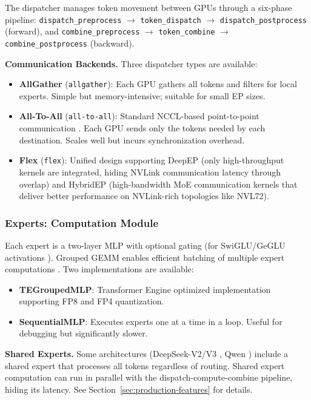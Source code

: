 \documentclass[10pt,logo,copyright]{nvidiatechreport}
\begin{document}
The dispatcher manages token movement between GPUs through a six-phase pipeline: \texttt{dispatch\_preprocess} $\rightarrow$ \texttt{token\_dispatch} $\rightarrow$ \texttt{dispatch\_postprocess} (forward), and \texttt{combine\_preprocess} $\rightarrow$ \texttt{token\_combine} $\rightarrow$ \texttt{combine\_postprocess} (backward).

\textbf{Communication Backends.} Three dispatcher types are available:
\begin{itemize}
    \item \textbf{AllGather} (\texttt{allgather}): Each GPU gathers all tokens and filters for local experts. Simple but memory-intensive; suitable for small EP sizes.
    \item \textbf{All-To-All} (\texttt{all-to-all}): Standard NCCL-based point-to-point communication \cite{lepikhin2020gshard}. Each GPU sends only the tokens needed by each destination. Scales well but incurs synchronization overhead.
    \item \textbf{Flex} (\texttt{flex}): Unified design supporting DeepEP (only high-throughput kernels are integrated, hiding NVLink communication latency through overlap) \cite{deepep2025} and HybridEP (high-bandwidth MoE communication kernels that deliver better performance on NVLink-rich topologies like NVL72).
\end{itemize}

\subsubsection{Experts: Computation Module}

Each expert is a two-layer MLP with optional gating (for SwiGLU/GeGLU activations \cite{shazeer2020glu}). Grouped GEMM enables efficient batching of multiple expert computations \cite{megablocks,hwang2023tutel}. Two implementations are available:

\begin{itemize}
    \item \textbf{TEGroupedMLP}: Transformer Engine \cite{nvidia_transformer_engine} optimized implementation supporting FP8 and FP4 quantization.
    \item \textbf{SequentialMLP}: Executes experts one at a time in a loop. Useful for debugging but significantly slower.
\end{itemize}

\textbf{Shared Experts.} Some architectures (DeepSeek-V2/V3 \cite{deepseekai2024deepseekv2strongeconomicalefficient,deepseekai2025deepseekv3technicalreport}, Qwen \cite{qwen2025qwen25technicalreport}) include a shared expert that processes all tokens regardless of routing. Shared expert computation can run in parallel with the dispatch-compute-combine pipeline, hiding its latency. See Section~\ref{sec:production-features} for details.
\end{document}
